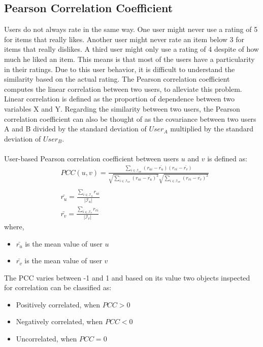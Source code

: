 \subsection{Pearson Correlation Coefficient}
Users do not always rate in the same way. One user might never use a rating of 5
for items that really likes.
Another user might never rate an item below 3 for items that really dislikes.
A third user might only use a rating of 4 despite of how much he liked an item.
This means is that most of the users have a particularity in their
ratings. Due to this user behavior, it is difficult to understand the similarity
based on the actual rating. The Pearson correlation coefficient
computes the linear correlation between two users, to alleviate this problem. Linear correlation is
defined as the proportion of dependence between two variables X and Y.
Regarding the similarity between two users, the Pearson correlation coefficient can also be
thought of as the covariance between two users A and B divided by the standard deviation of
$User_A$ multiplied by the standard deviation of $User_B$.\\\\
User-based Pearson correlation coefficient between users $u$ and $v$ is defined as:
\begin{equation}\label{eq:pearson}
\begin{split}
    &PCC(u,v) = \frac{\sum_{i \in \mathcal{I}_{uv}}(r_{ui}-\bar{r_{u}})(r_{vi}-\bar{r_{v}})}
                     {\sqrt{\sum_{i \in \mathcal{I}_{uv}}(r_{ui}-\bar{r_{u}})^2}
                      \sqrt{\sum_{i \in \mathcal{I}_{uv}}(r_{vi}-\bar{r_{v}})^2}} \\\\
    &\bar{r_{u}} = \frac{\sum_{i \in \mathcal{I}_u}r_{ui}}
                        {\mathopen|\mathcal{I}_u\mathclose|}\\
    &\bar{r_{v}} = \frac{\sum_{i \in \mathcal{I}_v}r_{vi}}
                        {\mathopen|\mathcal{I}_v\mathclose|}
\end{split}
\end{equation}
where,
\begin{itemize}
	\item[] $\bar{r_u}$ is the mean value of user $u$
	\item[] $\bar{r_v}$ is the mean value of user $v$
\end{itemize}
The PCC varies between -1 and 1 and based on its value two objects inspected for correlation can
be classified as:
\begin{itemize}
	\item Positively correlated, when $PCC > 0$
	\item Negatively correlated, when $PCC < 0$
	\item Uncorrelated,  when $PCC = 0$
\end{itemize}
